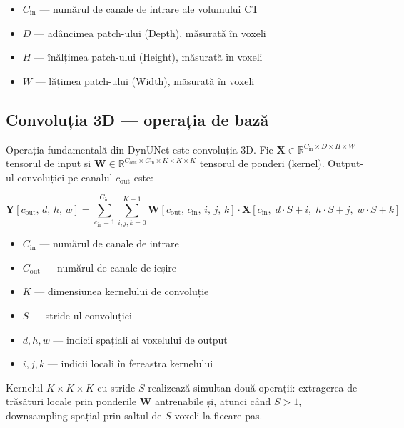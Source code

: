 \documentclass[12pt, a4paper]{report}
\begin{document}
\begin{itemize}
    \item $C_{\text{in}}$ — numărul de canale de intrare ale volumului CT
    \item $D$ — adâncimea patch-ului (Depth), măsurată în voxeli
    \item $H$ — înălțimea patch-ului (Height), măsurată în voxeli
    \item $W$ — lățimea patch-ului (Width), măsurată în voxeli
\end{itemize}

\subsection{Convoluția 3D — operația de bază}

Operația fundamentală din DynUNet este convoluția 3D. Fie
$\mathbf{X} \in \mathbb{R}^{C_{\text{in}} \times D \times H \times W}$
tensorul de input și
$\mathbf{W} \in \mathbb{R}^{C_{\text{out}} \times C_{\text{in}}
\times K \times K \times K}$ tensorul de ponderi (kernel).
Output-ul convoluției pe canalul $c_{\text{out}}$ este:

\begin{equation}
    \mathbf{Y}[c_{\text{out}},\, d,\, h,\, w]
    = \sum_{c_{\text{in}}=1}^{C_{\text{in}}}
      \sum_{i,j,k=0}^{K-1}
      \mathbf{W}[c_{\text{out}},\, c_{\text{in}},\, i,\, j,\, k]
      \cdot
      \mathbf{X}[c_{\text{in}},\;
                 d{\cdot}S+i,\;
                 h{\cdot}S+j,\;
                 w{\cdot}S+k]
\end{equation}

\begin{itemize}
    \item $C_{\text{in}}$ — numărul de canale de intrare
    \item $C_{\text{out}}$ — numărul de canale de ieșire
    \item $K$ — dimensiunea kernelului de convoluție
    \item $S$ — stride-ul convoluției
    \item $d, h, w$ — indicii spațiali ai voxelului de output
    \item $i, j, k$ — indicii locali în fereastra kernelului
\end{itemize}

Kernelul $K \times K \times K$ cu stride $S$ realizează simultan
două operații: extragerea de trăsături locale prin ponderile
$\mathbf{W}$ antrenabile și, atunci când $S > 1$, downsampling
spațial prin saltul de $S$ voxeli la fiecare pas.
\end{document}
